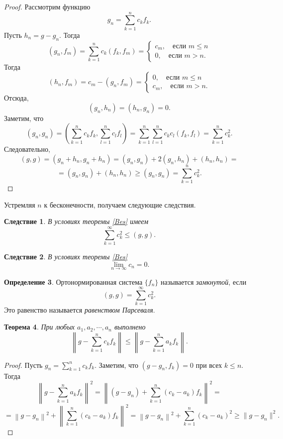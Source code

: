 \documentclass[12pt, titlepage, oneside]{amsbook}
\newtheorem{theorem}{Теорема}[chapter]
\newtheorem{corollary}[theorem]{Следствие}
\theoremstyle{definition}
\newtheorem{definition}[theorem]{Определение}
\theoremstyle{remark}
\begin{document}
\begin{proof}
	Рассмотрим функцию $$g_n=\sum\limits_{k=1}^n c_kf_k.$$ Пусть $h_n=g-g_n$. Тогда $$(g_n,f_m)=\sum\limits_{k=1}^n c_k(f_k,f_m)=\begin{cases}c_m,\quad\text{если $m\leq n$} \\
			0,\quad\text{если $m>n$}.\end{cases}$$ Тогда $$(h_n,f_m)=c_m-(g_n,f_m)=\begin{cases}0,\quad\text{если $m\leq n$} \\
			c_m,\quad\text{если $m>n$}.\end{cases}$$ Отсюда, $$(g_n,h_n)=(h_n,g_n)=0.$$ Заметим, что $$(g_n,g_n)=\left(\sum\limits_{k=1}^n c_kf_k,\sum\limits_{l=1}^n c_lf_l\right)=\sum\limits_{k=1}^n\sum\limits_{l=1}^nc_k c_l(f_k,f_l)=\sum\limits_{k=1}^n c_k^2.$$ Следовательно, $$(g,g)=(g_n+h_n,g_n+h_n)=(g_n,g_n)+2(g_n,h_n)+(h_n,h_n)=$$ $$=(g_n,g_n)+(h_n,h_n)\geq (g_n,g_n)=\sum\limits_{k=1}^n c_k^2.$$
\end{proof}

Устремляя $n$ к бесконечности, получаем следующие следствия.

\begin{corollary}
	\label{Bes2}
	В условиях теоремы \ref{Bes} имеем $$\sum\limits_{k=1}^{\infty} c_k^2\leq(g,g).$$
\end{corollary}

\begin{corollary}
	\label{Bes3}
	В условиях теоремы \ref{Bes} $$\lim\limits_{n\rightarrow\infty} c_n=0.$$
\end{corollary}

\begin{definition}
	Ортонормированная система $\{f_n\}$ называется \emph{замкнутой}, если $$(g,g)=\sum\limits_{k=1}^{\infty} c_k^2.$$ Это равенство называется \emph{равенством Парсеваля}.
\end{definition}

\begin{theorem}
	\label{Bes4}
	При любых $a_1,a_2,\cdots, a_n$ выполнено $$\left\|g-\sum\limits_{k=1}^{n} c_k f_k\right\|\leq\left\|g-\sum\limits_{k=1}^{n} a_k f_k\right\|.$$
\end{theorem}

\begin{proof}
	Пусть $g_n=\sum\limits_{k=1}^{n} c_k f_k$. Заметим, что $(g-g_n,f_k)=0$ при всех $k\leq n$. Тогда $$\left\|g-\sum\limits_{k=1}^{n} a_k f_k\right\|^2=\left\|(g-g_n)+\sum\limits_{k=1}^{n}(c_k-a_k) f_k\right\|^2=$$ $$=\left\|g-g_n\right\|^2+\left\|\sum\limits_{k=1}^{n}(c_k-a_k) f_k\right\|^2=\left\|g-g_n\right\|^2+\sum\limits_{k=1}^{n}(c_k-a_k)^2\geq\|g-g_n\|^2.$$
\end{proof}
\end{document}
